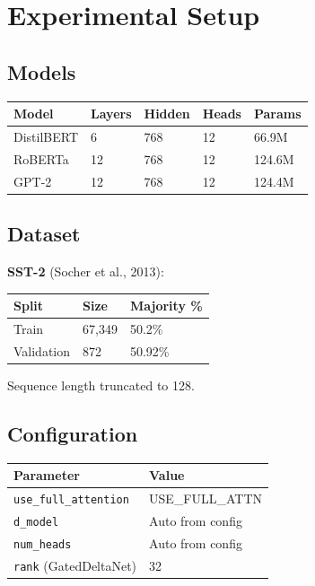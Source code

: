 
\section{Experimental Setup}

\subsection{Models}

\begin{table}[H]
\centering
\small
\begin{tabular}{lllll}
\toprule
\textbf{Model} & \textbf{Layers} & \textbf{Hidden} & \textbf{Heads} & \textbf{Params} \\
\midrule
DistilBERT & 6 & 768 & 12 & 66.9M \\
RoBERTa & 12 & 768 & 12 & 124.6M \\
GPT-2 & 12 & 768 & 12 & 124.4M \\
\bottomrule
\end{tabular}
\end{table}

\subsection{Dataset}

\textbf{SST-2} (Socher et al., 2013):

\begin{table}[H]
\centering
\small
\begin{tabular}{lll}
\toprule
\textbf{Split} & \textbf{Size} & \textbf{Majority \%} \\
\midrule
Train & 67,349 & 50.2\% \\
Validation & 872 & 50.92\% \\
\bottomrule
\end{tabular}
\end{table}

Sequence length truncated to 128.

\subsection{Configuration}

\begin{table}[H]
\centering
\small
\begin{tabular}{ll}
\toprule
\textbf{Parameter} & \textbf{Value} \\
\midrule
\texttt{use\_full\_attention} & {{USE\_FULL\_ATTN}} \\
\texttt{d\_model} & Auto from config \\
\texttt{num\_heads} & Auto from config \\
\texttt{rank} (GatedDeltaNet) & 32 \\
\bottomrule
\end{tabular}
\end{table}

